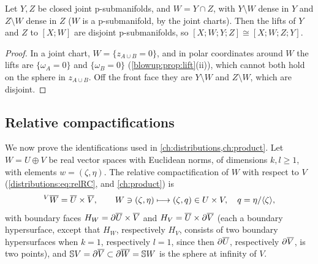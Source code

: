\begin{corollary}\label{blowup:cor:intersection}
Let $Y,Z$ be closed joint p-submanifolds, and $W=Y\cap Z$, with $Y\setminus W$ dense in
$Y$ and $Z\setminus W$ dense in $Z$ \textup{(}$W$ is a p-submanifold, by the joint
charts\textup{)}. Then the lifts of $Y$ and $Z$ to $[X;W]$ are disjoint
p-submanifolds, so $[X;W;Y;Z]\cong[X;W;Z;Y]$.
\end{corollary}
\begin{proof}
In a joint chart, $W=\{z_{A\cup B}=0\}$, and in polar coordinates around $W$ the lifts are
$\{\omega_A=0\}$ and $\{\omega_B=0\}$ (\cref{blowup:prop:lift}(ii)), which cannot both hold on
the sphere in $z_{A\cup B}$. Off the front face they are $Y\setminus W$ and $Z\setminus W$,
which are disjoint.
\end{proof}

\subsection{Relative compactifications}
We now prove the identifications used in \cref{ch:distributions,ch:product}. Let
$W=U\oplus V$ be real vector spaces with Euclidean norms, of dimensions $k,l\ge1$, with
elements $w=(\zeta,\eta)$. The relative compactification of $W$ with respect to $V$
(\eqref{distributions:eq:relRC}, and \cref{ch:product}) is
\begin{equation*}
  {}^{V}\overline{W}=\overline{U}\times\overline{V},\qquad W\ni(\zeta,\eta)\longmapsto(\zeta,q)\in U\times V,\quad
  q=\eta/\langle \zeta\rangle,
\end{equation*}
with boundary faces $H_W=\partial\overline{U}\times\overline{V}$ and $H_V=\overline{U}\times\partial\overline{V}$ (each a boundary
hypersurface, except that $H_W$, respectively $H_V$, consists of two boundary hypersurfaces
when $k=1$, respectively $l=1$, since then $\partial\overline{U}$, respectively $\partial\overline{V}$, is two
points), and
$\mathbb{S} V=\partial\overline{V}\subset\partial\overline{W}=\mathbb{S} W$ is the sphere at infinity of $V$.

